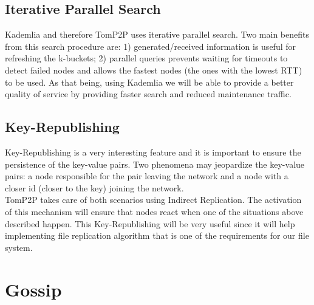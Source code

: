 \documentclass[times,9pt,article]{llncs}
\begin{document}
\subsection{Iterative Parallel Search}
Kademlia and therefore TomP2P uses iterative parallel search. Two main benefits
from this search procedure are: 1) generated/received information is useful for
 refreshing the k-buckets; 2) parallel queries prevents waiting for timeouts to
 detect failed nodes and allows the fastest nodes (the ones with the lowest RTT)
 to be used. As that being, using Kademlia we will be able to provide a better 
 quality of service by providing faster search and reduced maintenance traffic.

\subsection{Key-Republishing}
Key-Republishing is a very interesting feature and it is important to ensure the
 persistence of the key-value pairs. Two phenomena may 
jeopardize the key-value pairs: a node responsible for the pair leaving the 
network and a node with a closer id (closer to the key) joining the network. \\
TomP2P takes care of both scenarios using Indirect Replication. The activation 
of this mechanism will ensure that nodes react when one of the situations above 
described happen. This Key-Republishing will be very useful since it will help 
implementing file replication algorithm that is one of the requirements for our 
file system.   

\section{Gossip}
\end{document}
